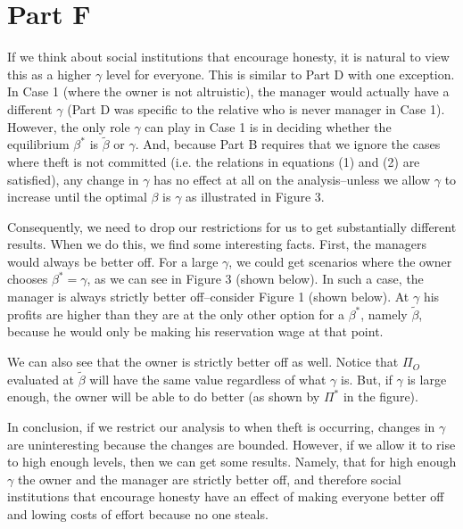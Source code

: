 \documentclass[12pt]{paper}
\begin{document}
\section{Part F}
If we think about social institutions that encourage honesty, it is natural to view this as a higher $\gamma$ level for everyone. This is similar to Part D with one exception. In Case 1 (where the owner is not altruistic), the manager would actually have a different $\gamma$ (Part D was specific to the relative who is never manager in Case 1). However, the only role $\gamma$ can play in Case 1 is in deciding whether the equilibrium $\beta^*$ is $\tilde{\beta}$ or $\gamma$. And, because Part B requires that we ignore the cases where theft is not committed (i.e. the relations in equations (1) and (2) are satisfied), any change in $\gamma$ has no effect at all on the analysis--unless we allow $\gamma$ to increase until the optimal $\beta$ is $\gamma$ as illustrated in Figure 3.

Consequently, we need to drop our restrictions for us to get substantially different results. When we do this, we find some interesting facts. First, the managers would always be better off. For a large $\gamma$, we could get scenarios where the owner chooses $\beta^*=\gamma$, as we can see in Figure 3 (shown below). In such a case, the manager is always strictly better off--consider Figure 1 (shown below). At $\gamma$ his profits are higher than they are at the only other option for a $\beta^*$, namely $\tilde{\beta}$, because he would only be making his reservation wage at that point.

We can also see that the owner is strictly better off as well. Notice that $\Pi_O$ evaluated at $\tilde{\beta}$ will have the same value regardless of what $\gamma$ is. But, if $\gamma$ is large enough, the owner will be able to do better (as shown by $\Pi^*$ in the figure).

In conclusion, if we restrict our analysis to when theft is occurring, changes in $\gamma$ are uninteresting because the changes are bounded. However, if we allow it to rise to high enough levels, then we can get some results. Namely, that for high enough $\gamma$ the owner and the manager are strictly better off, and therefore social institutions that encourage honesty have an effect of making everyone better off and lowing costs of effort because no one steals.
\end{document}

